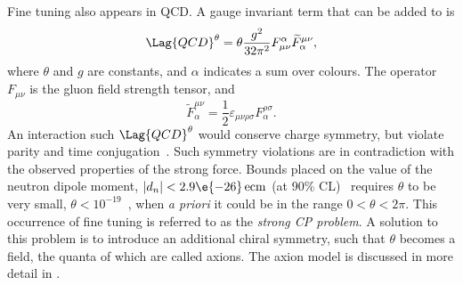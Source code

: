 Fine tuning also appears in QCD.
A gauge invariant term that can be added to  is
\begin{equation}
  \Lag{QCD}^\theta = \theta\frac{g^2}{32\pi^2}
  F_{\mu\nu}^\alpha\widetilde F^{\mu\nu}_\alpha,
\end{equation}
where $\theta$ and $g$ are constants, and $\alpha$ indicates a sum over colours.
The operator $F_{\mu\nu}$ is the gluon field strength tensor, and
\begin{equation}
  \widetilde F^{\mu\nu}_\alpha = \frac12\varepsilon_{\mu\nu\rho\sigma}F^{\rho\sigma}_\alpha.
\end{equation}
An interaction such $\Lag{QCD}^\theta$ would conserve charge symmetry, but violate parity and time
conjugation~\cite{Peccei:2006as}.
Such symmetry violations are in contradiction with the observed properties of the strong
force.
Bounds placed on the value of the neutron dipole moment, $|d_n| <2.9\e{-26}\,\mathrm{ecm}$
(at 90\% CL)~\cite{Baker:2006ts} requires $\theta$ to be very small,
$\theta<10^{-19}$~\cite{Crewther:PQref9}, when \emph{a priori} it could be in the range
$0<\theta<2\pi$.
This occurrence of fine tuning is referred to as the \emph{strong CP problem}.
A solution to this problem is to introduce an additional chiral symmetry, such that $\theta$
becomes a field, the quanta of which are called axions.
The axion model is discussed in more detail in .


